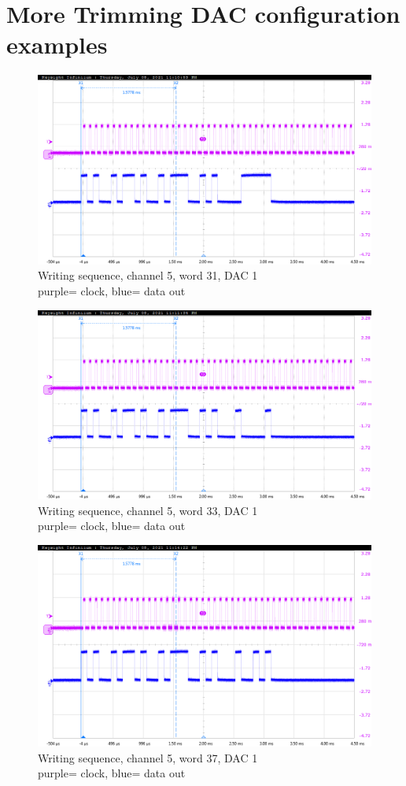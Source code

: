 \appendix
\chapter{More Trimming DAC configuration examples}\label{DacAppendix}

\begin{figure}[H]
	\centering
	\includegraphics[width=0.6\linewidth]{IMG/ch5/probe/09-08-2021_ch05-write31-baselinedac1}
	\caption{Writing sequence, channel 5, word 31, DAC 1\\{\color{magenta}purple}= clock, {\color{blue}blue}= data out}
	\label{fig:ch05write31}
\end{figure}

\begin{figure}[H]
	\centering
	\includegraphics[width=0.6\linewidth]{IMG/ch5/probe/09-08-2021_ch05-write33-baselinedac1}
	\caption{Writing sequence, channel 5, word 33, DAC 1\\{\color{magenta}purple}= clock, {\color{blue}blue}= data out}
	\label{fig:ch05write33}
\end{figure}
\newpage
\thispagestyle{plain}
\begin{figure}[H]
	\centering
	\includegraphics[width=0.6\linewidth]{IMG/ch5/probe/09-08-2021_ch05-write37-baselinedac1}
	\caption{Writing sequence, channel 5, word 37, DAC 1\\{\color{magenta}purple}= clock, {\color{blue}blue}= data out}
	\label{fig:ch05write37}
\end{figure}

